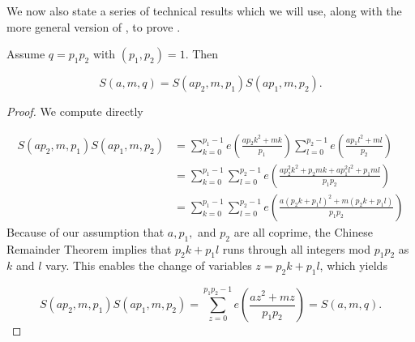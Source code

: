 \documentclass[11pt]{amsart}
\begin{document}
We now also state a series of technical results which we will use, along with the more general version of , to prove .

\begin{lemma}\label{4: GaussSummsMultiplicativeLemma}
    Assume $q = p_1p_2$ with $(p_1,p_2)=1$. Then

    \begin{equation}\label{4: GaussSummsMultiplicativeEqn}
        S(a,m,q) = S(ap_2,m,p_1)S(ap_1,m,p_2).
    \end{equation}
\end{lemma}
\begin{proof}
    We compute directly

    \begin{align*}
         S(ap_2,m,p_1)S(ap_1,m,p_2)& = \sum_{k=0}^{p_1-1}e(\frac{ap_2k^2+mk}{p_1})\sum_{l=0}^{p_2-1}e(\frac{ap_1l^2+ml}{p_2}) \\ 
         & = \sum_{k=0}^{p_1-1}\sum_{l=0}^{p_2-1}e(\frac{ap_2^2k^2+p_2mk+ap_1^2l^2+p_1ml}{p_1p_2})\\
         &=\sum_{k=0}^{p_1-1}\sum_{l=0}^{p_2-1}e(\frac{a(p_2k+p_1l)^2+m(p_2k+p_1l)}{p_1p_2})
    \end{align*}
    Because of our assumption that $a,p_1,$ and $p_2$ are all coprime, the Chinese Remainder Theorem implies that $p_2k+p_1l$ runs through all integers mod $p_1p_2$ as $k$ and $l$ vary. This enables the change of variables $z=p_2k+p_1l$, which yields

    \begin{equation*}
        S(ap_2,m,p_1)S(ap_1,m,p_2) = \sum_{z=0}^{p_1p_2-1}e(\frac{az^2+mz}{p_1p_2}) = S(a,m,q).
    \end{equation*}
\end{proof}
\end{document}
